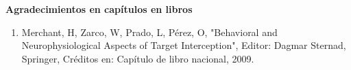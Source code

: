 \textbf{Agradecimientos en capítulos en libros}

\begin{enumerate}
\item Merchant, H, Zarco, W, Prado, L, Pérez, O, "Behavioral and Neurophysiological Aspects of Target Interception", Editor: 
Dagmar Sternad, Springer, Créditos en: Capítulo de libro nacional, 2009.
\end{enumerate}
